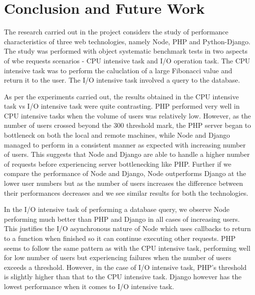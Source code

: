 \documentclass[../thesis.tex]{subfiles}
\begin{document}
\section{Conclusion and Future Work}
The research carried out in the project considers the study of performance characteristics of three web technologies, namely Node, PHP and Python-Django. The study was performed with object systematic benchmark tests in two aspects of wbe requests scenarios - CPU intensive task and I/O operation task. The CPU intensive task was to perform the caluclation of a large Fibonacci value and return it to the user. The I/O intensive task involved a query to the database.
\newline

As per the experiments carried out, the results obtained in the CPU intensive task vs I/O intensive task were quite contrasting. PHP performed very well in CPU intensive tasks when the volume of users was relatively low. However, as the number of users crossed beyond the 300 threshold mark, the PHP server began to bottleneck on both the local and remote machines, while Node and Django managed to perform in a consistent manner as expected with increasing number of users. This suggests that Node and Django are able to handle a higher number of requests before experiencing server bottlenecking like PHP. Further if we compare the performance of Node and Django, Node outperforms Django at the lower user numbers but as the number of users increases the difference between their performances decreases and we see similar results for both the technologies. 
\newline

In the I/O intensive task of performing a database query, we observe Node performing much better than PHP and Django in all cases of increasing users. This justifies the I/O asynchronous nature of Node which uses callbacks to return to a function when finished so it can continue executing other requests. PHP seems to follow the same pattern as with the CPU intensive task, performing well for low number of users but experiencing failures when the number of users exceeds a threshold. However, in the case of I/O intensive task, PHP's threshold is slightly higher than that to the CPU intensive task. Django however has the lowest performance when it comes to I/O intensive task.
\newline
\end{document}
